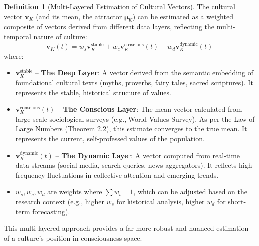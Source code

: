 \documentclass[11pt,a4paper]{article}
\theoremstyle{definition}
\newtheorem{definition}{Definition}[section]
\theoremstyle{remark}
\begin{document}
\begin{small}
\begin{definition}[Multi-Layered Estimation of Cultural Vectors]
The cultural vector \(\mathbf{v}_K\) (and its mean, the attractor \(\boldsymbol{\mu}_K\)) can be estimated as a weighted composite of vectors derived from different data layers, reflecting the multi-temporal nature of culture:
\begin{equation}
\hat{\mathbf{v}}_K(t) = w_s \mathbf{v}_K^{\text{stable}} + w_c \mathbf{v}_K^{\text{conscious}}(t) + w_d \mathbf{v}_K^{\text{dynamic}}(t)
\end{equation}
where:
\begin{itemize}
    \item \(\mathbf{v}_K^{\text{stable}}\) -- \textbf{The Deep Layer}: A vector derived from the semantic embedding of foundational cultural texts (myths, proverbs, fairy tales, sacred scriptures). It represents the stable, historical structure of values.
    \item \(\mathbf{v}_K^{\text{conscious}}(t)\) -- \textbf{The Conscious Layer}: The mean vector calculated from large-scale sociological surveys (e.g., World Values Survey). As per the Law of Large Numbers (Theorem 2.2), this estimate converges to the true mean. It represents the current, self-professed values of the population.
    \item \(\mathbf{v}_K^{\text{dynamic}}(t)\) -- \textbf{The Dynamic Layer}: A vector computed from real-time data streams (social media, search queries, news aggregators). It reflects high-frequency fluctuations in collective attention and emerging trends.
    \item \(w_s, w_c, w_d\) are weights where \(\sum w_i = 1\), which can be adjusted based on the research context (e.g., higher \(w_s\) for historical analysis, higher \(w_d\) for short-term forecasting).
\end{itemize}
This multi-layered approach provides a far more robust and nuanced estimation of a culture's position in consciousness space.
\end{definition}

\begin{figure}[H]
\centering
{}
\end{figure}
\end{small}
\end{document}
